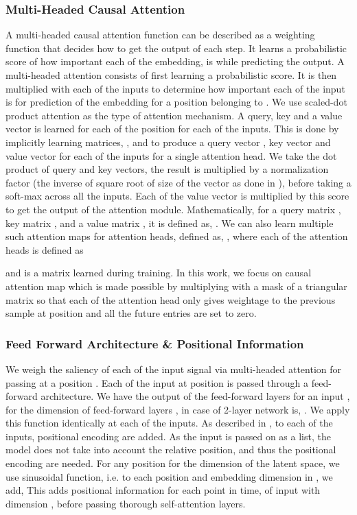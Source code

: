 \documentclass{article}
\begin{document}
\begin{sloppy}
\subsubsection{Multi-Headed Causal Attention} A multi-headed causal attention function can be described as a weighting function that decides how to get the output of each step. It learns a probabilistic score of how important each of the embedding, is while predicting the output.  A multi-headed attention consists of first learning a probabilistic score. It is then multiplied with each of the inputs to determine how important each of the input is for prediction of the embedding for a position  belonging to  . We use scaled-dot product attention as the type of attention mechanism. A query, key and a value vector is learned for each of the position for each of the inputs. This is done by implicitly learning matrices, ,  and  to produce a query vector , key vector  and value vector  for each of the inputs for a single attention head.  We take the dot product of query and key vectors, the result is multiplied by a normalization factor (the inverse of square root of size of the vector as done in \cite{vaswani2017attention}), before taking a soft-max across all the inputs. Each of the value vector is multiplied by this score to get the output of the attention module. Mathematically, for a query matrix , key matrix , and a value matrix , it is defined as, . We can also learn multiple such attention maps for  attention heads, defined as, , 
where each of the attention heads  is defined as 

and  is a matrix learned during training. In this work, we focus on causal attention map which is made possible by multiplying with a mask of a triangular matrix so that each of the attention head only gives weightage to the previous sample at position  and all the future entries are set to zero.  \cite{brown2020language}

\subsubsection {Feed Forward Architecture \&  Positional Information } We weigh the saliency of each of the input signal via multi-headed attention for passing at a position . Each of the input at position  is passed through a feed-forward architecture. We have the output of the feed-forward layers  for an input , for the dimension of feed-forward layers , in case of 2-layer network is, . We apply this function identically at each of the inputs. As described in \cite{vaswani2017attention}, to each of the inputs, positional encoding are added. As the input is passed on as a list, the model does not take into account the relative position, and thus the positional encoding are needed. For any position  for the dimension  of the latent space, we use sinusoidal function, i.e. to each position  and embedding dimension  in , we add,  This adds positional information for each point in time, of input with dimension  , before passing thorough self-attention layers. 


\end{sloppy}
\end{document}
